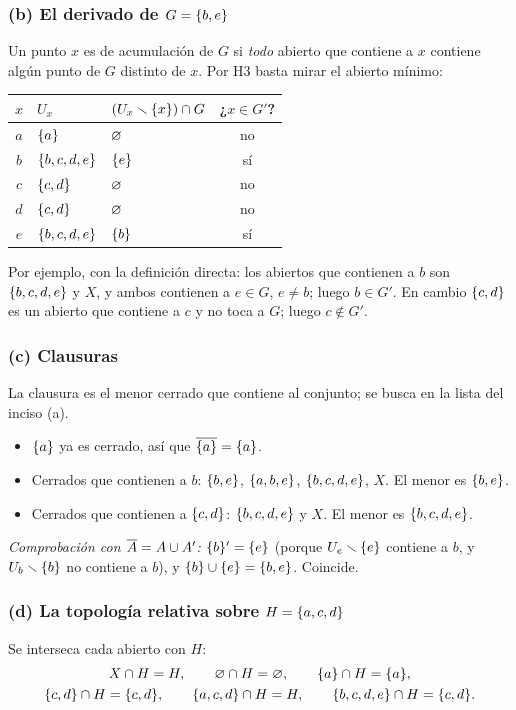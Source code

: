 \subsubsection*{(b) El derivado de $G=\{b,e\}$}
Un punto $x$ es de acumulación de $G$ si \emph{todo} abierto que contiene a $x$ contiene algún punto de $G$ distinto
de $x$. Por H3 basta mirar el abierto mínimo:
\begin{center}\small\renewcommand{\arraystretch}{1.2}
\begin{tabular}{@{}cllc@{}}\toprule
$x$ & $U_x$ & $(U_x\smallsetminus\{x\})\cap G$ & ¿$x\in G'$?\\ \midrule
$a$ & $\{a\}$ & $\varnothing$ & no\\
$b$ & $\{b,c,d,e\}$ & $\{e\}$ & sí\\
$c$ & $\{c,d\}$ & $\varnothing$ & no\\
$d$ & $\{c,d\}$ & $\varnothing$ & no\\
$e$ & $\{b,c,d,e\}$ & $\{b\}$ & sí\\ \bottomrule
\end{tabular}\end{center}
Por ejemplo, con la definición directa: los abiertos que contienen a $b$ son $\{b,c,d,e\}$ y $X$, y ambos contienen
a $e\in G$, $e\neq b$; luego $b\in G'$. En cambio $\{c,d\}$ es un abierto que contiene a $c$ y no toca a $G$; luego
$c\notin G'$.

\subsubsection*{(c) Clausuras}
La clausura es el menor cerrado que contiene al conjunto; se busca en la lista del inciso (a).
\begin{itemize}
\item $\{a\}$ ya es cerrado, así que $\overline{\{a\}}=\{a\}$.
\item Cerrados que contienen a $b$: $\{b,e\}$, $\{a,b,e\}$, $\{b,c,d,e\}$, $X$. El menor es $\{b,e\}$.
\item Cerrados que contienen a $\{c,d\}$: $\{b,c,d,e\}$ y $X$. El menor es $\{b,c,d,e\}$.
\end{itemize}
\emph{Comprobación con $\overline{A}=A\cup A'$:} $\{b\}'=\{e\}$ (porque $U_e\smallsetminus\{e\}$ contiene a $b$, y $U_b\smallsetminus\{b\}$ no
contiene a $b$), y $\{b\}\cup\{e\}=\{b,e\}$. Coincide.

\subsubsection*{(d) La topología relativa sobre $H=\{a,c,d\}$}
Se interseca cada abierto con $H$:
\begin{gather*}
X\cap H=H,\qquad \varnothing\cap H=\varnothing,\qquad \{a\}\cap H=\{a\},\\
\{c,d\}\cap H=\{c,d\},\qquad \{a,c,d\}\cap H=H,\qquad \{b,c,d,e\}\cap H=\{c,d\}.
\end{gather*}

